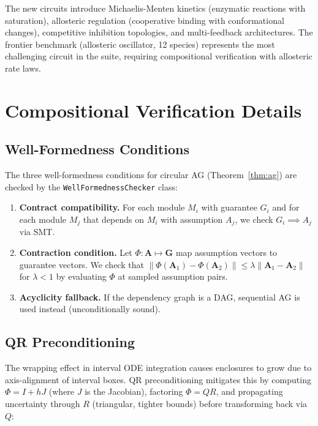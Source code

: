 \documentclass[11pt]{article}
\begin{document}
The new circuits introduce Michaelis-Menten kinetics (enzymatic
reactions with saturation), allosteric regulation (cooperative
binding with conformational changes), competitive inhibition
topologies, and multi-feedback architectures. The frontier benchmark
(allosteric oscillator, 12 species) represents the most challenging
circuit in the suite, requiring compositional verification with
allosteric rate laws.

\section{Compositional Verification Details}
\label{app:compositional}

\subsection{Well-Formedness Conditions}

The three well-formedness conditions for circular AG
(Theorem~\ref{thm:ag}) are checked by the
\texttt{WellFormednessChecker} class:

\begin{enumerate}
\item \textbf{Contract compatibility.} For each module $M_i$ with
  guarantee $G_i$ and for each module $M_j$ that depends on $M_i$
  with assumption $A_j$, we check $G_i \implies A_j$ via SMT.

\item \textbf{Contraction condition.} Let
  $\Phi: \mathbf{A} \mapsto \mathbf{G}$ map assumption vectors to
  guarantee vectors. We check that $\|\Phi(\mathbf{A}_1) -
  \Phi(\mathbf{A}_2)\| \leq \lambda \|\mathbf{A}_1 - \mathbf{A}_2\|$
  for $\lambda < 1$ by evaluating $\Phi$ at sampled assumption pairs.

\item \textbf{Acyclicity fallback.} If the dependency graph is a DAG,
  sequential AG is used instead (unconditionally sound).
\end{enumerate}

\subsection{QR Preconditioning}

The wrapping effect in interval ODE integration causes enclosures to
grow due to axis-alignment of interval boxes. QR preconditioning
mitigates this by computing $\Phi = I + hJ$ (where $J$ is the
Jacobian), factoring $\Phi = QR$, and propagating uncertainty through
$R$ (triangular, tighter bounds) before transforming back via $Q$:
\end{document}

